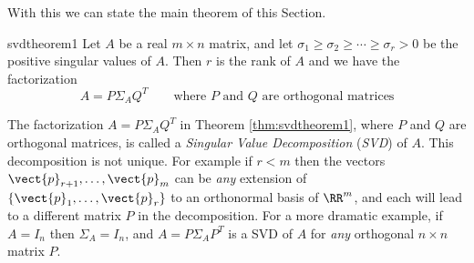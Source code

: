 With this we can state the main theorem of this Section.

\begin{theorem}{}{svdtheorem1} 
Let $A$ be a real $m\times n$ matrix, and let $\sigma_{1}\geq \sigma_{2}\geq
\cdots \geq \sigma_{r}>0$ be the positive singular values of $A$.
Then $r$ is the rank of $A$ and we have the factorization
\begin{equation*}
A=P\Sigma_{A}Q^{T}\qquad \mbox{where } P \mbox{ and } Q \mbox{ are orthogonal matrices}
\end{equation*}
\end{theorem}

The factorization $A=P\Sigma _{A}Q^{T}$ in Theorem \ref{thm:svdtheorem1}, where $P$ and $Q$
are orthogonal matrices, is called a \emph{Singular Value Decomposition} (\emph{SVD}) of $A$. This decomposition is not unique. For example if $r<m$ then the vectors $\vect{p}_{r+1},\ldots ,\vect{p}_{m}$ can be \emph{any}
extension of $\{\vect{p}_{1},\ldots ,\vect{p}_{r}\}$ to an orthonormal
basis of $\RR^{m}$, and each will lead to a different matrix $P$ in
the decomposition. For a more dramatic example, if $A=I_{n}$ then $\Sigma_{A}=I_{n}$, and $A=P\Sigma_{A}P^{T}$ is a SVD of $A$ for \emph{any} orthogonal $n\times n$ matrix $P$. 

